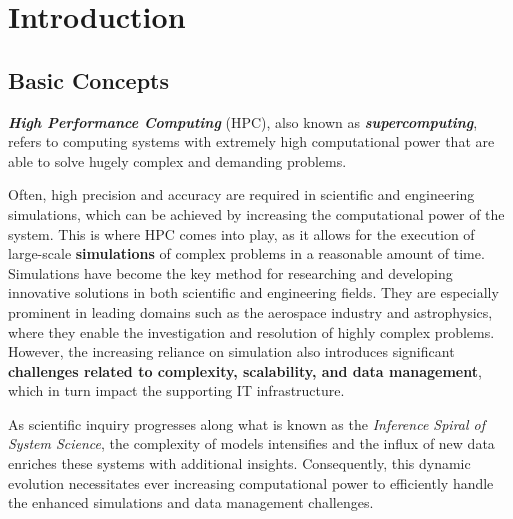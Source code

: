 \chapter{Introduction}

\section{Basic Concepts} \label{sec:basic_concepts}

\textbf{\textit{High Performance Computing}} (HPC), also known as \textbf{\textit{supercomputing}}, refers to computing systems with extremely high computational power that are able to solve hugely complex and demanding problems. \cite{europaHighPerformance}

Often, high precision and accuracy are required in scientific and engineering simulations, which can be achieved by increasing the computational power of the system. This is where HPC comes into play, as it allows for the execution of large-scale \textbf{simulations} of complex problems in a reasonable amount of time. Simulations have become the key method for researching and developing innovative solutions in both scientific and engineering fields. They are especially prominent in leading domains such as the aerospace industry and astrophysics, where they enable the investigation and resolution of highly complex problems. However, the increasing reliance on simulation also introduces significant \textbf{challenges related to complexity, scalability, and data management}, which in turn impact the supporting IT infrastructure.

As scientific inquiry progresses along what is known as the \textit{Inference Spiral of System Science}, the complexity of models intensifies and the influx of new data enriches these systems with additional insights. Consequently, this dynamic evolution necessitates ever increasing computational power to efficiently handle the enhanced simulations and data management challenges.

